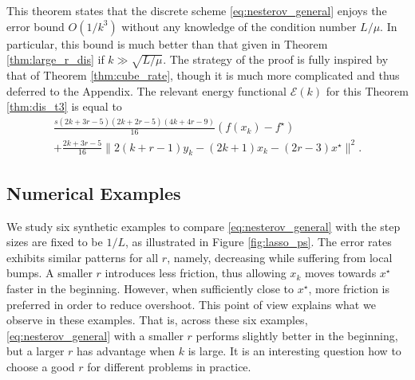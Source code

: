 \documentclass[twoside,11pt]{article}
\begin{document}
This theorem states that the discrete scheme \eqref{eq:nesterov_general} enjoys the error bound $O(1/k^3)$ without any knowledge of the condition number $L/\mu$. In particular, this bound is much better than that given in Theorem \ref{thm:large_r_dis} if $k \gg \sqrt{L/\mu}$. The strategy of the proof is fully inspired by that of Theorem \ref{thm:cube_rate}, though it is much more complicated and thus deferred to the Appendix. The relevant energy functional $\mathcal{E}(k)$ for this Theorem \ref{thm:dis_t3} is equal to
\begin{multline}\label{eq:dis_t3_energy}
\frac{s(2k+3r-5)(2k+2r-5)(4k+4r-9)}{16}(f(x_k)-f^\star)\\ + \frac{2k+3r-5}{16}\|2(k+r-1)y_k - (2k+1)x_k - (2r-3)x^\star\|^2.
\end{multline}

\subsection{Numerical Examples}
\label{sec:numerical-examples1}
We study six synthetic examples to compare \eqref{eq:nesterov_general} with the step sizes are fixed to be $1/L$, as illustrated in Figure \ref{fig:lasso_ps}. The error rates exhibits similar patterns for all $r$, namely, decreasing while suffering from local bumps. A smaller $r$ introduces less friction, thus allowing $x_k$ moves towards $x^\star$ faster in the beginning. However, when sufficiently close to $x^\star$, more friction is preferred in order to reduce overshoot. This point of view explains what we observe in these examples. That is, across these six examples, \eqref{eq:nesterov_general} with a smaller $r$ performs slightly better in the beginning, but a larger $r$ has advantage when $k$ is large. It is an interesting question how to choose a good $r$ for different problems in practice.
\end{document}
